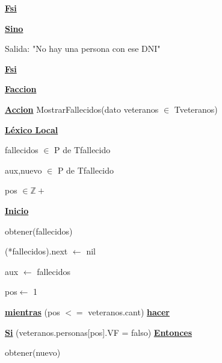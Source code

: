 \documentclass{article}
\begin{document}
                \hspace{16mm}\underline{\textbf{Fsi}}

            \hspace{12mm}\underline{\textbf{Sino}}

                \hspace{16mm}Salida: "No hay una persona con ese DNI"

            \hspace{12mm}\underline{\textbf{Fsi}}

    \hspace{4mm}\underline{\textbf{Faccion}}

    \vspace{4mm}

    \hspace{4mm}\underline{\textbf{Accion}} MostrarFallecidos(dato veteranos $\in$ Tveteranos)

        \hspace{8mm}\underline{\textbf{Léxico Local}}

            \hspace{12mm}fallecidos $\in$ P de Tfallecido

            \hspace{12mm}aux,nuevo $\in$ P de Tfallecido

            \hspace{12mm}pos $\in \mathbb{Z}+$

        \hspace{8mm}\underline{\textbf{Inicio}}

            \hspace{12mm}obtener(fallecidos)

            \hspace{12mm}(*fallecidos).next $\leftarrow$ nil

            \hspace{12mm}aux $\leftarrow$ fallecidos

            \hspace{12mm}pos$\leftarrow$ 1

            \hspace{12mm}\underline{\textbf{mientras}} (pos $<=$ veteranos.cant) \underline{\textbf{hacer}}

                \hspace{16mm}\underline{\textbf{Si}} (veteranos.personas[pos].VF = falso) \underline{\textbf{Entonces}}

                    \hspace{20mm}obtener(nuevo)
\end{document}
